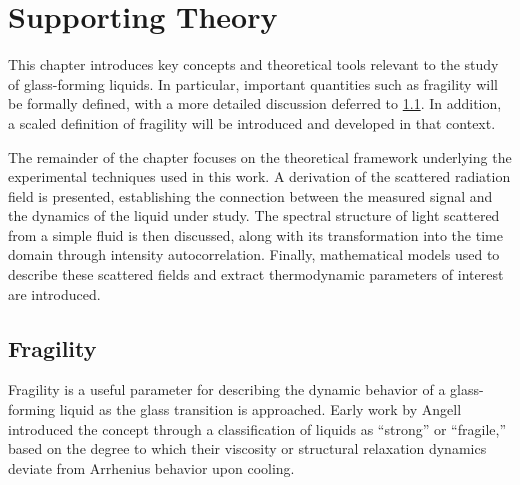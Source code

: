 \chapter{Supporting Theory}
\label{chap:theory}

This chapter introduces key concepts and theoretical tools relevant to the study of glass-forming liquids. In particular, important quantities such as fragility will be formally defined, with a more detailed discussion deferred to \sect \ref{sec:Fragility}. In addition, a scaled definition of fragility will be introduced and developed in that context.

The remainder of the chapter focuses on the theoretical framework underlying the experimental techniques used in this work. A derivation of the scattered radiation field is presented, establishing the connection between the measured signal and the dynamics of the liquid under study. The spectral structure of light scattered from a simple fluid is then discussed, along with its transformation into the time domain through intensity autocorrelation. Finally, mathematical models used to describe these scattered fields and extract thermodynamic parameters of interest are introduced.


\section{Fragility} \label{sec:Fragility}

Fragility is a useful parameter for describing the dynamic behavior of a glass-forming liquid as the glass transition is approached. Early work by Angell~\cite{Angell1985} introduced the concept through a classification of liquids as ``strong'' or ``fragile,'' based on the degree to which their viscosity or structural relaxation dynamics deviate from Arrhenius behavior upon cooling. 

\graphicspath{{Chapters/Methodology/Figures/}}

